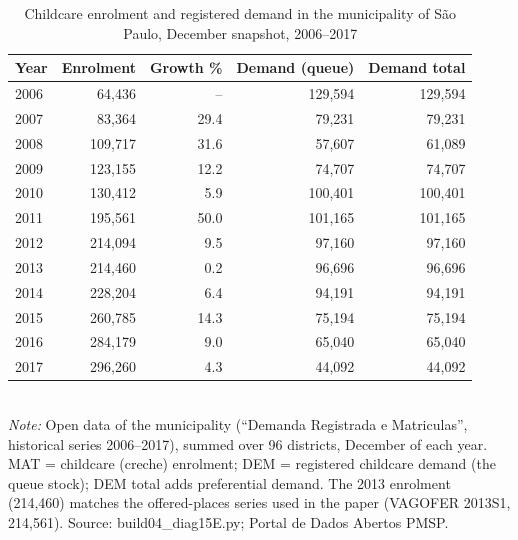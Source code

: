 \begin{table}[htbp]\centering
\caption{Childcare enrolment and registered demand in the municipality of S\~ao Paulo, December snapshot, 2006--2017}
\label{tab:D15_E_anual_dez}
\small
\begin{tabular}{lrrrr}
\toprule
Year & Enrolment & Growth \% & Demand (queue) & Demand total \\
\midrule
2006 & 64,436 & -- & 129,594 & 129,594 \\
2007 & 83,364 & 29.4 & 79,231 & 79,231 \\
2008 & 109,717 & 31.6 & 57,607 & 61,089 \\
2009 & 123,155 & 12.2 & 74,707 & 74,707 \\
2010 & 130,412 & 5.9 & 100,401 & 100,401 \\
2011 & 195,561 & 50.0 & 101,165 & 101,165 \\
2012 & 214,094 & 9.5 & 97,160 & 97,160 \\
2013 & 214,460 & 0.2 & 96,696 & 96,696 \\
2014 & 228,204 & 6.4 & 94,191 & 94,191 \\
2015 & 260,785 & 14.3 & 75,194 & 75,194 \\
2016 & 284,179 & 9.0 & 65,040 & 65,040 \\
2017 & 296,260 & 4.3 & 44,092 & 44,092 \\
\bottomrule
\end{tabular}
\\[3pt]{\footnotesize \textit{Note:} Open data of the municipality (``Demanda Registrada e Matriculas'', historical series 2006--2017), summed over 96 districts, December of each year. MAT = childcare (creche) enrolment; DEM = registered childcare demand (the queue stock); DEM total adds preferential demand. The 2013 enrolment (214,460) matches the offered-places series used in the paper (VAGOFER 2013S1, 214,561). Source: build04\_diag15E.py; Portal de Dados Abertos PMSP.}
\end{table}
